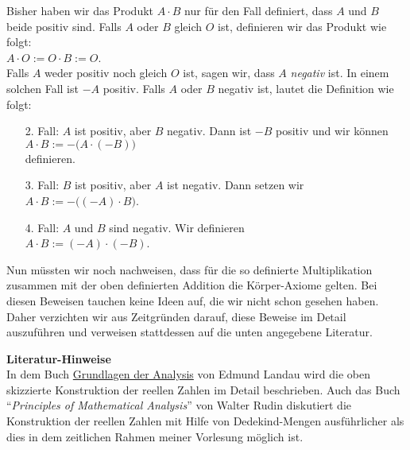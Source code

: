 \renewcommand{\labelenumi}{\arabic{enumi}.}
Bisher haben wir das Produkt $A \cdot B$ nur für den Fall definiert, dass $A$ und $B$ beide positiv
sind.  Falls $A$ oder $B$ gleich $O$ ist, definieren wir das Produkt wie folgt:
\\[0.2cm]
\hspace*{1.3cm}
$A \cdot O := O \cdot B := O$.
\\[0.2cm]
Falls $A$ weder positiv noch gleich $O$ ist, sagen wir, dass $A$  \emph{negativ} ist.  In einem
solchen Fall ist $-\!A$ positiv.  Falls $A$ oder $B$ negativ ist, lautet die Definition wie folgt:
\begin{enumerate}
\item[2.] Fall: $A$ ist positiv, aber $B$ negativ.  Dann ist $-\!B$ positiv und wir können
          \\[0.2cm]
          \hspace*{1.3cm}
          $A \cdot B := -\!\bigl(A \cdot (-\!B)\bigr)$
          \\[0.2cm]
          definieren.
\item[3.] Fall: $B$ ist positiv, aber $A$ ist negativ.  Dann setzen wir
          \\[0.2cm]
          \hspace*{1.3cm}
          $A \cdot B := -\!\bigl((-\!A) \cdot B\bigr)$.
\item[4.] Fall: $A$ und $B$ sind negativ.  Wir definieren
          \\[0.2cm]
          \hspace*{1.3cm}
          $A \cdot B := (-\!A) \cdot (-\!B)$.
\end{enumerate}
Nun müssten wir noch nachweisen, dass für die so definierte Multiplikation zusammen mit der oben definierten
Addition die Körper-Axiome gelten.  Bei diesen Beweisen tauchen keine Ideen auf, die wir nicht schon gesehen haben.
Daher verzichten wir aus Zeitgründen darauf, diese Beweise im Detail auszuführen und verweisen stattdessen
auf die unten angegebene Literatur.
\vspace*{0.3cm}

\noindent
\textbf{Literatur-Hinweise} \\
In dem Buch 
\href{http://www.fernuni-hagen.de/imperia/md/content/ausstellung/juedischemathematiker/landau.pdf}{Grundlagen der Analysis} 
von Edmund Landau \cite{landau:1930} wird die oben skizzierte Konstruktion der reellen Zahlen im Detail beschrieben.   
Auch das Buch ``\emph{Principles of  Mathematical Analysis}'' von Walter Rudin \cite{rudin:1976}
diskutiert die Konstruktion der reellen Zahlen mit Hilfe von Dedekind-Mengen ausführlicher als dies in
dem zeitlichen Rahmen meiner Vorlesung möglich ist.


